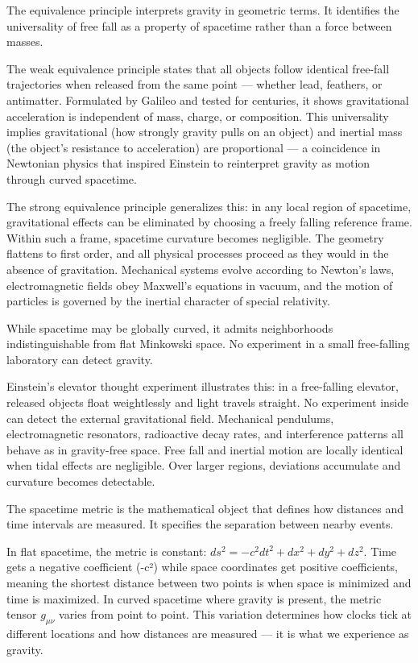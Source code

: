 The equivalence principle interprets gravity in geometric terms. It identifies the universality of free fall as a property of spacetime rather than a force between masses.

The weak equivalence principle states that all objects follow identical free-fall trajectories when released from the same point — whether lead, feathers, or antimatter. Formulated by Galileo and tested for centuries, it shows gravitational acceleration is independent of mass, charge, or composition. This universality implies gravitational (how strongly gravity pulls on an object) and inertial mass (the object's resistance to acceleration) are proportional — a coincidence in Newtonian physics that inspired Einstein to reinterpret gravity as motion through curved spacetime.

The strong equivalence principle generalizes this: in any local region of spacetime, gravitational effects can be eliminated by choosing a freely falling reference frame. Within such a frame, spacetime curvature becomes negligible. The geometry flattens to first order, and all physical processes proceed as they would in the absence of gravitation. Mechanical systems evolve according to Newton's laws, electromagnetic fields obey Maxwell's equations in vacuum, and the motion of particles is governed by the inertial character of special relativity.

While spacetime may be globally curved, it admits neighborhoods indistinguishable from flat Minkowski space. No experiment in a small free-falling laboratory can detect gravity.

Einstein's elevator thought experiment illustrates this: in a free-falling elevator, released objects float weightlessly and light travels straight. No experiment inside can detect the external gravitational field. Mechanical pendulums, electromagnetic resonators, radioactive decay rates, and interference patterns all behave as in gravity-free space. Free fall and inertial motion are locally identical when tidal effects are negligible. Over larger regions, deviations accumulate and curvature becomes detectable.

The spacetime metric is the mathematical object that defines how distances and time intervals are measured. It specifies the separation between nearby events.

In flat spacetime, the metric is constant: \(ds^2 = -c^2 dt^2 + dx^2 + dy^2 + dz^2\). Time gets a negative coefficient (-c²) while space coordinates get positive coefficients, meaning the shortest distance between two points is when space is minimized and time is maximized. In curved spacetime where gravity is present, the metric tensor \(g_{\mu\nu}\) varies from point to point. This variation determines how clocks tick at different locations and how distances are measured — it is what we experience as gravity.

